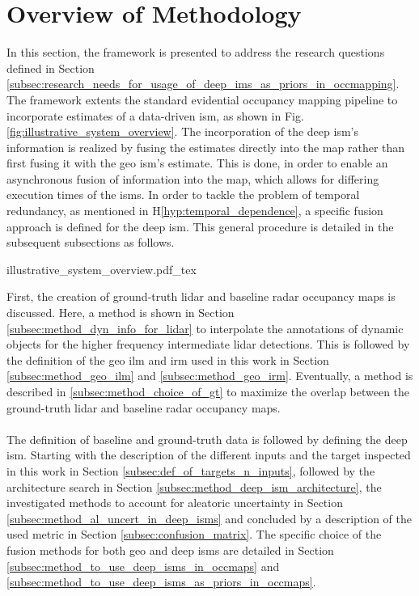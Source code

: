 \section{Overview of Methodology}
\label{sec:framework_overview}
In this section, the framework is presented to address the research questions defined in Section \ref{subsec:research_needs_for_usage_of_deep_ims_as_priors_in_occmapping}. The framework extents the standard evidential occupancy mapping pipeline \cite{pagac1996evidential} to incorporate estimates of a data-driven \gls{ism}, as shown in Fig. \ref{fig:illustrative_system_overview}. The incorporation of the deep \gls{ism}'s information is realized by fusing the estimates directly into the map rather than first fusing it with the geo \gls{ism}'s estimate. This is done, in order to enable an asynchronous fusion of information into the map, which allows for differing execution times of the \gls{ism}s. In order to tackle the problem of temporal redundancy, as mentioned in H\ref{hyp:temporal_dependence}, a specific fusion approach is defined for the deep \gls{ism}. This general procedure is detailed in the subsequent subsections as follows.
\begin{center}
	{illustrative_system_overview.pdf_tex}
\end{center}
First, the creation of ground-truth lidar and baseline radar occupancy maps is discussed. Here, a method is shown in Section \ref{subsec:method_dyn_info_for_lidar} to interpolate the annotations of dynamic objects for the higher frequency intermediate lidar detections. This is followed by the definition of the geo \gls{ilm} and \gls{irm} used in this work in Section \ref{subsec:method_geo_ilm} and \ref{subsec:method_geo_irm}. Eventually, a method is described in \ref{subsec:method_choice_of_gt} to maximize the overlap between the ground-truth lidar and baseline radar occupancy maps.
\\\\
The definition of baseline and ground-truth data is followed by defining the deep \gls{ism}. Starting with the description of the different inputs and the target inspected in this work in Section \ref{subsec:def_of_targets_n_inputs}, followed by the architecture search in Section \ref{subsec:method_deep_ism_architecture}, the investigated methods to account for aleatoric uncertainty in Section \ref{subsec:method_al_uncert_in_deep_isms} and concluded by a description of the used metric in Section \ref{subsec:confusion_matrix}. The specific choice of the fusion methods for both geo and deep \gls{ism}s are detailed in Section \ref{subsec:method_to_use_deep_isms_in_occmaps} and \ref{subsec:method_to_use_deep_isms_as_priors_in_occmaps}.
%
